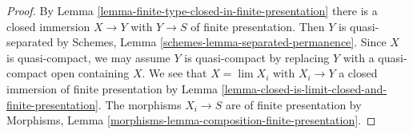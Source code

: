 \documentclass[10pt,a4paper]{amsart}
\theoremstyle{plain}
\theoremstyle{definition}
\theoremstyle{remark}
\numberwithin{equation}{subsection}
\def\lim{\mathop{\mathrm{lim}}\nolimits}
\begin{document}
\begin{proof}
By Lemma \ref{lemma-finite-type-closed-in-finite-presentation}
there is a closed immersion $X \to Y$ with $Y \to S$ of
finite presentation. Then $Y$ is quasi-separated by
Schemes, Lemma \ref{schemes-lemma-separated-permanence}.
Since $X$ is quasi-compact, we may assume
$Y$ is quasi-compact by replacing $Y$ with a quasi-compact open
containing $X$. We see that $X = \lim X_i$ with $X_i \to Y$ a closed
immersion of finite presentation by
Lemma \ref{lemma-closed-is-limit-closed-and-finite-presentation}.
The morphisms $X_i \to S$ are of finite presentation by
Morphisms, Lemma \ref{morphisms-lemma-composition-finite-presentation}.
\end{proof}
\end{document}
